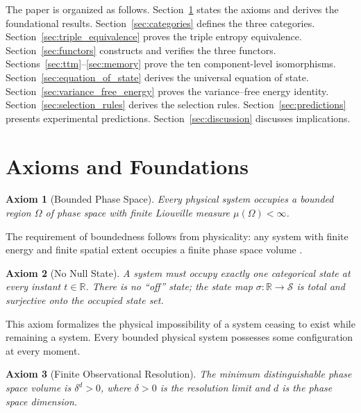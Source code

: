 \documentclass[twocolumn,10pt]{article}
\newtheorem{axiom}{Axiom}
\theoremstyle{remark}
\begin{document}
The paper is organized as follows.
Section~\ref{sec:axioms} states the axioms and derives the foundational results.
Section~\ref{sec:categories} defines the three categories.
Section~\ref{sec:triple_equivalence} proves the triple entropy equivalence.
Section~\ref{sec:functors} constructs and verifies the three functors.
Sections~\ref{sec:ttm}--\ref{sec:memory} prove the ten component-level isomorphisms.
Section~\ref{sec:equation_of_state} derives the universal equation of state.
Section~\ref{sec:variance_free_energy} proves the variance--free energy identity.
Section~\ref{sec:selection_rules} derives the selection rules.
Section~\ref{sec:predictions} presents experimental predictions.
Section~\ref{sec:discussion} discusses implications.

\section{Axioms and Foundations}
\label{sec:axioms}

\begin{axiom}[Bounded Phase Space]
\label{axiom:bounded}
Every physical system occupies a bounded region $\Omega$ of phase space with finite Liouville measure $\mu(\Omega) < \infty$.
\end{axiom}

The requirement of boundedness follows from physicality: any system with finite energy and finite spatial extent occupies a finite phase space volume \cite{arnold1989,liouville1838}.

\begin{axiom}[No Null State]
\label{axiom:nonull}
A system must occupy exactly one categorical state at every instant $t \in \mathbb{R}$.
There is no ``off'' state; the state map $\sigma: \mathbb{R} \to \mathcal{S}$ is total and surjective onto the occupied state set.
\end{axiom}

This axiom formalizes the physical impossibility of a system ceasing to exist while remaining a system.
Every bounded physical system possesses some configuration at every moment.

\begin{axiom}[Finite Observational Resolution]
\label{axiom:resolution}
The minimum distinguishable phase space volume is $\delta^d > 0$, where $\delta > 0$ is the resolution limit and $d$ is the phase space dimension.
\end{axiom}
\end{document}
